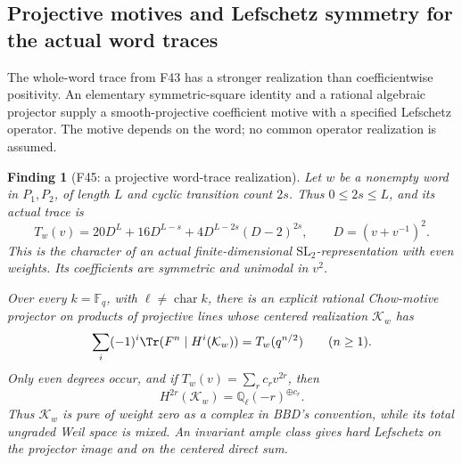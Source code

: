 \documentclass[11pt,a4paper]{article}
\newcommand{\Q}{\mathbb Q}\newcommand{\Z}{\mathbb Z}\newcommand{\C}{\mathbb C}\newcommand{\N}{\mathbb N}\newcommand{\F}{\mathbb F}
\newcommand{\fid}[1]{\textsf{#1}}\newcommand{\gate}[1]{\textsf{#1}}
\theoremstyle{named}\newtheorem{finding}{Finding}[section]
\theoremstyle{definition}\newtheorem{definition}[finding]{Definition}
\theoremstyle{remark}\newtheorem{remark}[finding]{Remark}
\begin{document}
\subsection{Projective motives and Lefschetz symmetry for the actual word traces}
The whole-word trace from \fid{F43} has a stronger realization than
coefficientwise positivity. An elementary symmetric-square identity
and a rational algebraic projector supply a smooth-projective
coefficient motive with a specified Lefschetz operator. The motive
depends on the word; no common operator realization is assumed.

\begin{finding}[\fid{F45}: a projective word-trace realization]\label{f:projectiveword}
Let $w$ be a nonempty word in $P_1,P_2$, of length $L$ and
cyclic transition count $2s$. Thus $0\le2s\le L$, and its actual
trace is
\[
 T_w(v)=20D^L+16D^{L-s}+4D^{L-2s}(D-2)^{2s},
 \qquad D=(v+v^{-1})^2.
\]
This is the character of an actual finite-dimensional
$\mathrm{SL}_2$-representation with even weights. Its coefficients
are symmetric and unimodal in $v^2$.

Over every $k=\F_q$, with $\ell\ne\operatorname{char}k$, there is
an explicit rational Chow-motive projector on products of
projective lines whose centered realization $\mathcal K_w$ has
\begin{equation}\label{eq:projectivewordtrace}
 \sum_i(-1)^i\Tr(F^n\mid H^i(\mathcal K_w))
             =T_w(q^{n/2})\qquad(n\ge1).
\end{equation}
Only even degrees occur, and if $T_w(v)=\sum_r c_rv^{2r}$, then
\[
 H^{2r}(\mathcal K_w)=\Q_\ell(-r)^{\oplus c_r}.
\]
Thus $\mathcal K_w$ is pure of weight zero as a complex in BBD's
convention, while its total ungraded Weil space is mixed.
An invariant ample class gives hard Lefschetz on the projector
image and on the centered direct sum.
\end{finding}
\end{document}
